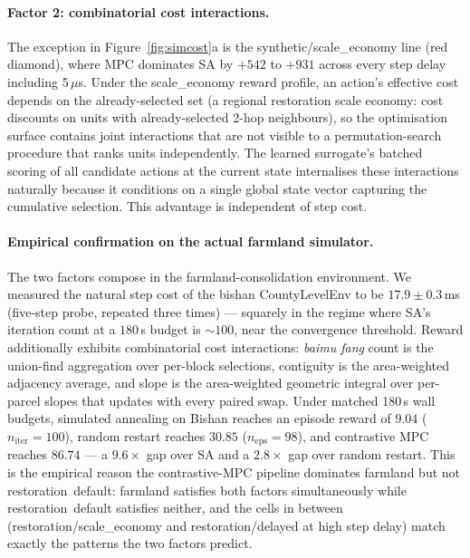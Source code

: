 \documentclass[11pt]{article}
\begin{document}
\paragraph{Factor 2: combinatorial cost interactions.} The exception in Figure~\ref{fig:simcost}a is the synthetic/scale\_economy line (red diamond), where MPC dominates SA by $+542$ to $+931$ across every step delay including 5\,$\mu$s. Under the scale\_economy reward profile, an action's effective cost depends on the already-selected set (a regional restoration scale economy: cost discounts on units with already-selected 2-hop neighbours), so the optimisation surface contains joint interactions that are not visible to a permutation-search procedure that ranks units independently. The learned surrogate's batched scoring of all candidate actions at the current state internalises these interactions naturally because it conditions on a single global state vector capturing the cumulative selection. This advantage is independent of step cost.

\paragraph{Empirical confirmation on the actual farmland simulator.} The two factors compose in the farmland-consolidation environment. We measured the natural step cost of the bishan CountyLevelEnv to be $17.9 \pm 0.3$\,ms (five-step probe, repeated three times) — squarely in the regime where SA's iteration count at a $180$\,s budget is $\sim 100$, near the convergence threshold. Reward additionally exhibits combinatorial cost interactions: \textit{baimu fang} count is the union-find aggregation over per-block selections, contiguity is the area-weighted adjacency average, and slope is the area-weighted geometric integral over per-parcel slopes that updates with every paired swap. Under matched 180\,s wall budgets, simulated annealing on Bishan reaches an episode reward of $9.04$ ($n_{\text{iter}}=100$), random restart reaches $30.85$ ($n_{\text{eps}}=98$), and contrastive MPC reaches $86.74$ — a $9.6\times$ gap over SA and a $2.8\times$ gap over random restart. This is the empirical reason the contrastive-MPC pipeline dominates farmland but not restoration~default: farmland satisfies both factors simultaneously while restoration~default satisfies neither, and the cells in between (restoration/scale\_economy and restoration/delayed at high step delay) match exactly the patterns the two factors predict.
\end{document}
